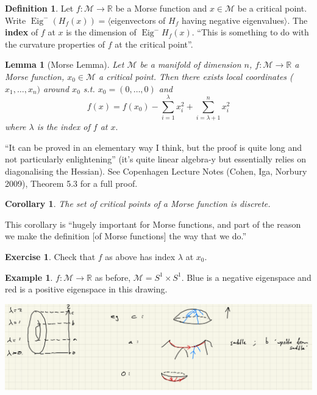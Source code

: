 \documentclass[10pt]{article}
\theoremstyle{plain}
\newtheorem{corollary}[thm]{Corollary}
\newtheorem{lemma}[thm]{Lemma}
\theoremstyle{definition}
\newtheorem{defn}[thm]{Definition} %
\newtheorem{exmp}[thm]{Example} %
\newtheorem{exercise}[thm]{Exercise}
\newcommand{\Real}{\mathbb{R}}
\newcommand{\man}{\mathcal{M}}
\newcommand{\xman}{x\in\man}
\newcommand{\sumfromto}[2]{\sum\limits_{#1}^{#2}}
\DeclareMathOperator{\Eig}{Eig}
\begin{document}
\begin{defn}
    Let $f:\man \to\Real$ be a Morse function and $\xman$ be a critical point. Write $\Eig^-(H_f(x)) = \langle $eigenvectors of $H_f$ having negative eigenvalues$\rangle$. The \textbf{index} of $f$ at $x$ is the dimension of $\Eig^-H_f(x)$. ``This is something to do with the curvature properties of $f$ at the critical point''.
\end{defn}

\begin{lemma}[Morse Lemma]\label{lem:MorseLemma}
    Let $\man$ be a manifold of dimension $n$, $f:\man \to \Real$ a Morse function, $x_0 \in \man$ a critical point. Then there exists local coordinates ($x_1,\ldots,x_n)$ around $x_0$ s.t. $x_0 = (0,\ldots,0)$ and 
    $$f(x) = f(x_0) - \sumfromto{i=1}{\lambda} x_i^2 + \sumfromto{i=\lambda+1}{n} x_i^2$$
    where $\lambda$ is the index of $f$ at $x.$
\end{lemma}
``It can be proved in an elementary way I think, but the proof is quite long and not particularly enlightening'' (it's quite linear algebra-y but essentially relies on diagonalising the Hessian). See Copenhagen Lecture Notes (Cohen, Iga, Norbury 2009), Theorem 5.3 for a full proof.

\begin{corollary}
    The set of critical points of a Morse function is discrete.
\end{corollary}\noindent
This corollary is ``hugely important for Morse functions, and part of the reason we make the definition [of Morse functions] the way that we do.''

\begin{exercise}
    Check that $f$ as above has index $\lambda$ at $x_0$.
\end{exercise}

\begin{exmp}
    $f:\man \to \Real$ as before, $\man = S^1 \times S^1$. Blue is a negative eigenspace and red is a positive eigenspace in this drawing.
    \begin{center}
        \includegraphics[width=\textwidth]{MorseTorusEigenvalues.png}
    \end{center}
\end{exmp}
\end{document}
